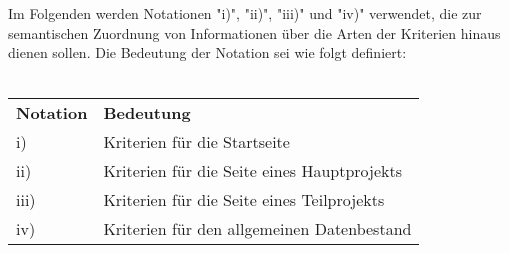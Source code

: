 Im Folgenden werden Notationen "i)", "ii)", "iii)" und "iv)" verwendet, die zur semantischen Zuordnung von Informationen über die Arten der Kriterien hinaus dienen sollen. Die Bedeutung der Notation sei wie folgt definiert:\\\\

\begin{tabularx}{\textwidth}{X X}
		\rowcolor[HTML]{C0C0C0}
		\textbf{Notation} & \textbf{Bedeutung} \\
		i) & Kriterien für die Startseite\\
		\rowcolor[HTML]{E7E7E7} 
		ii) & Kriterien für die Seite eines Hauptprojekts\\
		iii) & Kriterien für die Seite eines Teilprojekts\\
		\rowcolor[HTML]{E7E7E7} 
		iv) & Kriterien für den allgemeinen Datenbestand\\
\end{tabularx}

